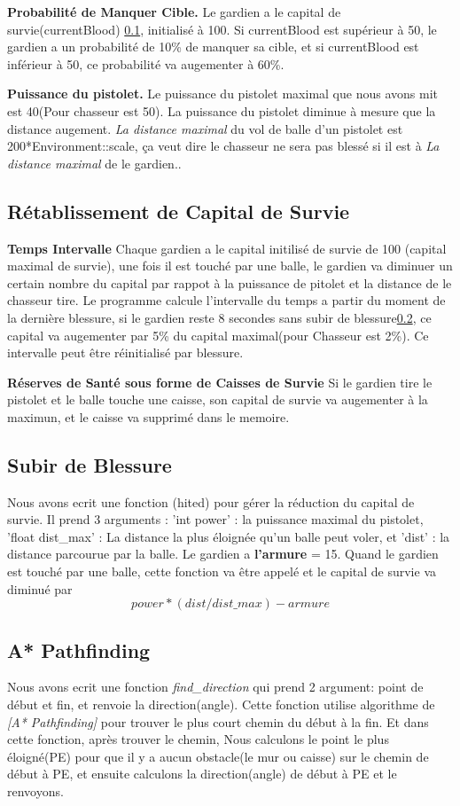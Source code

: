\documentclass{article}
\begin{document}
\textbf{Probabilité de Manquer Cible.} Le gardien a le capital de survie(currentBlood) \ref{CapitalSurvie}, initialisé à 100. Si currentBlood est supérieur à 50, le gardien a un probabilité de 10\% de manquer sa cible, et si currentBlood est inférieur à 50, ce probabilité va augementer à 60\%.

\textbf{Puissance du pistolet.} Le puissance du pistolet maximal que nous avons mit est 40(Pour chasseur est 50). La puissance du pistolet diminue à mesure que la distance augement. \textsl{La distance maximal} du vol de balle d'un pistolet est 200*Environment::scale, ça veut dire le chasseur ne sera pas blessé si il est à \textsl{La distance maximal} de le gardien..

\subsection{Rétablissement de Capital de Survie}
\label{CapitalSurvie}
\textbf{Temps Intervalle} Chaque gardien a le capital initilisé de survie de 100 (capital maximal de survie), une fois il est touché par une balle, le gardien va diminuer un certain nombre du capital par rappot à la puissance de pitolet et la distance de le chasseur tire. Le programme calcule l'intervalle du temps a partir du moment de la dernière blessure, si le gardien reste 8 secondes sans subir de blessure\ref{SubirBlessure}, ce capital va augementer par 5\% du capital maximal(pour Chasseur est 2\%). Ce intervalle peut être réinitialisé par blessure.

\textbf{Réserves de Santé sous forme de Caisses de Survie} Si le gardien tire le pistolet et le balle touche une caisse, son capital de survie va augementer à la maximun, et le caisse va supprimé dans le memoire.

\subsection{Subir de Blessure}
\label{SubirBlessure}
Nous avons ecrit une fonction (hited) pour gérer la réduction du capital de survie. Il prend 3 arguments : 'int power' : la puissance maximal du pistolet, 'float dist\_max' : La distance la plus éloignée qu'un balle peut voler, et 'dist' : la distance parcourue par la balle. Le gardien a \textbf{l'armure} = 15. Quand le gardien est touché par une balle, cette fonction va être appelé et le capital de survie va diminué par $$power * (dist/dist\_max) - armure$$

\subsection{A* Pathfinding}
Nous avons ecrit une fonction \textsl{find\_direction} qui prend 2 argument: point de début et fin, et renvoie la direction(angle). Cette fonction utilise algorithme de \textsl{[A* Pathfinding]} pour trouver le plus court chemin du début à la fin. Et dans cette fonction, après trouver le chemin, Nous calculons le point le plus éloigné(PE) pour que il y a aucun obstacle(le mur ou caisse) sur le chemin de début à PE, et ensuite calculons la direction(angle) de début à PE et le renvoyons. 
\end{document}
